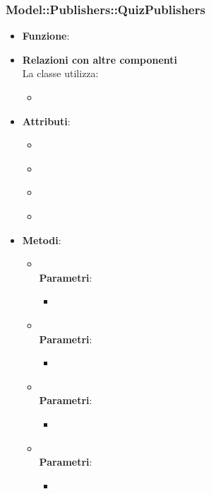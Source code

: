 \subsubsection{Model::Publishers::QuizPublishers}
\begin{itemize}
\item\textbf{Funzione}:
\item\textbf{Relazioni con altre componenti}\\
La classe utilizza:
	\begin{itemize}
		\item
	\end{itemize}
\item\textbf{Attributi}:
	\begin{itemize}
		\item\code{}\\
		\item\code{}\\
		\item\code{}\\
		\item\code{}\\
	\end{itemize}
\item\textbf{Metodi}:
	\begin{itemize}
		\item\code{}\\
		\textbf{Parametri}:
			\begin{itemize}
				\item\code{}\\
			\end{itemize}
		\item\code{}\\
		\textbf{Parametri}:
			\begin{itemize}
				\item\code{}\\
			\end{itemize}
		\item\code{}\\
		\textbf{Parametri}:
			\begin{itemize}
				\item\code{}\\
			\end{itemize}
		\item\code{}\\
		\textbf{Parametri}:
			\begin{itemize}
				\item\code{}\\
			\end{itemize}
	\end{itemize}
\end{itemize}

